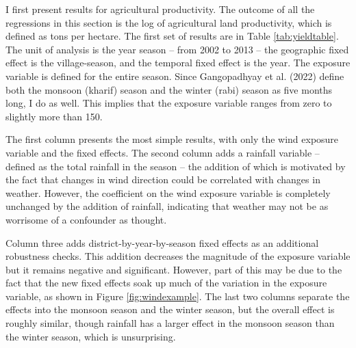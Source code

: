 \documentclass[
]{article}
\begin{document}
I first present results for agricultural productivity. The outcome of all the regressions in this section is the log of agricultural land productivity, which is defined as tons per hectare. The first set of results are in Table \ref{tab:yieldtable}. The unit of analysis is the year season -- from 2002 to 2013 -- the geographic fixed effect is the village-season, and the temporal fixed effect is the year. The exposure variable is defined for the entire season. Since Gangopadhyay et al. (2022) define both the monsoon (kharif) season and the winter (rabi) season as five months long, I do as well. This implies that the exposure variable ranges from zero to slightly more than 150.

The first column presents the most simple results, with only the wind exposure variable and the fixed effects. The second column adds a rainfall variable -- defined as the total rainfall in the season -- the addition of which is motivated by the fact that changes in wind direction could be correlated with changes in weather. However, the coefficient on the wind exposure variable is completely unchanged by the addition of rainfall, indicating that weather may not be as worrisome of a confounder as thought.

Column three adds district-by-year-by-season fixed effects as an additional robustness checks. This addition decreases the magnitude of the exposure variable but it remains negative and significant. However, part of this may be due to the fact that the new fixed effects soak up much of the variation in the exposure variable, as shown in Figure \ref{fig:windexample}. The last two columns separate the effects into the monsoon season and the winter season, but the overall effect is roughly similar, though rainfall has a larger effect in the monsoon season than the winter season, which is unsurprising.
\end{document}
